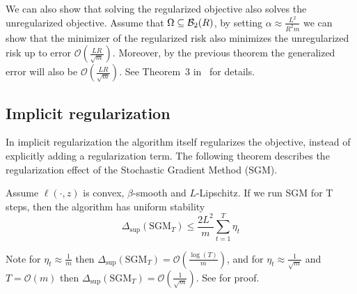 We can also show that solving the regularized objective also solves the
unregularized objective. Assume that $\Omega \subseteq \mathcal{B}_2(R)$, by
setting $\alpha \approx \frac{L^2}{R^2 m}$ we can show that the minimizer of the
regularized risk also minimizes the unregularized risk up to error
$\mathcal{O}(\frac{LR}{\sqrt{m}})$. Moreover, by the previous theorem the
generalized error will also be $\mathcal{O}(\frac{LR}{\sqrt{m}})$. See Theorem~3
in~\cite{Shalev2010LearnabilitySA} for details.

\subsection{Implicit regularization}

In implicit regularization the algorithm itself regularizes the objective, instead of explicitly adding a regularization term. The following theorem describes the regularization effect of the Stochastic Gradient Method (SGM). 

\begin{theorem}Assume $\ell(\cdot, z)$ is convex, $\beta$-smooth and $L$-Lipschitz. If we run SGM for T steps, then the algorithm has uniform stability
\begin{equation*}
\Delta_{\sup}(\text{SGM}_T) \leq \frac{2 L^2}{m} \sum_{t=1}^T \eta_t
\end{equation*}
\end{theorem}
Note for $\eta_t \approx \frac{1}{m}$ then $\Delta_{\sup}(\text{SGM}_T) = \mathcal{O}(\frac{\log(T)}{m})$, and for $\eta_t \approx \frac{1}{\sqrt{m}}$ and $T=\mathcal{O}(m)$ then $\Delta_{\sup}(\text{SGM}_T) = \mathcal{O}(\frac{1}{\sqrt{m}} )$. See \cite{HardtRS15} for proof.

